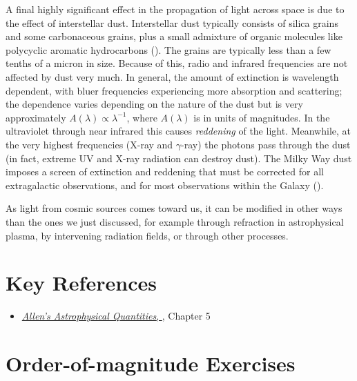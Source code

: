 A final highly significant effect in the propagation of light across
space is due to the effect of interstellar dust. Interstellar dust
typically consists of silica grains and some carbonaceous grains, plus
a small admixture of organic molecules like polycyclic aromatic
hydrocarbons (\citealt{weingartner01a, draine03a}). The grains are
typically less than a few tenths of a micron in size. Because of this,
radio and infrared frequencies are not affected by dust very much. In
general, the amount of extinction is wavelength dependent, with bluer
frequencies experiencing more absorption and scattering; the
dependence varies depending on the nature of the dust but is very
approximately $A(\lambda) \propto \lambda^{-1}$, where $A(\lambda)$ is
in units of magnitudes. In the ultraviolet through near infrared this
causes {\it reddening} of the light. Meanwhile, at the very highest
frequencies (X-ray and $\gamma$-ray) the photons pass through the dust
(in fact, extreme UV and X-ray radiation can destroy dust). The Milky
Way dust imposes a screen of extinction and reddening that must be
corrected for all extragalactic observations, and for most
observations within the Galaxy (\citealt{schlegel98a}).

As light from cosmic sources comes toward us, it can be modified in
other ways than the ones we just discussed, for example through
refraction in astrophysical plasma, by intervening radiation fields,
or through other processes. 
  

\section{Key References}

\begin{itemize}
  \item
    \href{http://adsabs.harvard.edu/abs/2000asqu.book.....C}{
    {\it Allen's Astrophysical Quantities},
      \citet{cox00a}}, Chapter 5
\end{itemize}

\section{Order-of-magnitude Exercises}

